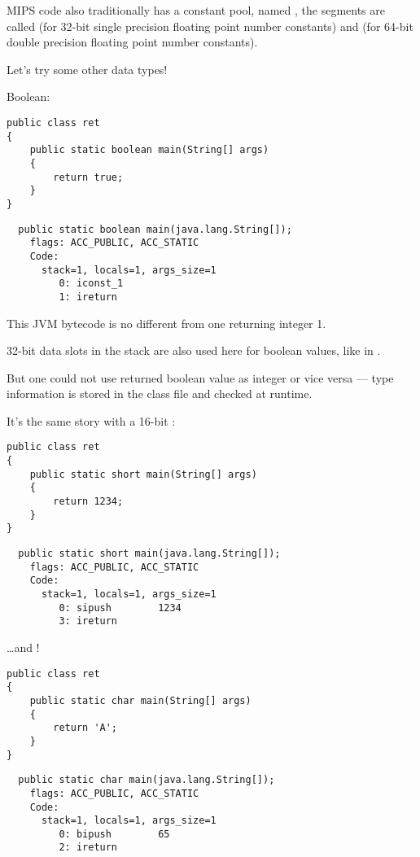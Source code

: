 MIPS code also traditionally has a constant pool, named , the segments
are called  (for 32-bit single precision floating point number constants) and 
(for 64-bit double precision floating point number constants).

Let's try some other data types!

Boolean:

\begin{lstlisting}[style=customjava]
public class ret
{
	public static boolean main(String[] args) 
	{
		return true;
	}
}
\end{lstlisting}

\begin{lstlisting}
  public static boolean main(java.lang.String[]);
    flags: ACC_PUBLIC, ACC_STATIC
    Code:
      stack=1, locals=1, args_size=1
         0: iconst_1      
         1: ireturn       
\end{lstlisting}

This JVM bytecode is no different from one returning integer 1.

32-bit data slots in the stack are also used here for boolean values, like in \CCpp.

But one could not use returned boolean value as integer or vice versa --- type information is stored in the class file and checked at runtime.

It's the same story with a 16-bit :

\begin{lstlisting}[style=customjava]
public class ret
{
	public static short main(String[] args) 
	{
		return 1234;
	}
}
\end{lstlisting}

\begin{lstlisting}
  public static short main(java.lang.String[]);
    flags: ACC_PUBLIC, ACC_STATIC
    Code:
      stack=1, locals=1, args_size=1
         0: sipush        1234
         3: ireturn       
\end{lstlisting}

\dots and !

\begin{lstlisting}[style=customjava]
public class ret
{
	public static char main(String[] args) 
	{
		return 'A';
	}
}
\end{lstlisting}

\begin{lstlisting}
  public static char main(java.lang.String[]);
    flags: ACC_PUBLIC, ACC_STATIC
    Code:
      stack=1, locals=1, args_size=1
         0: bipush        65
         2: ireturn       
\end{lstlisting}

